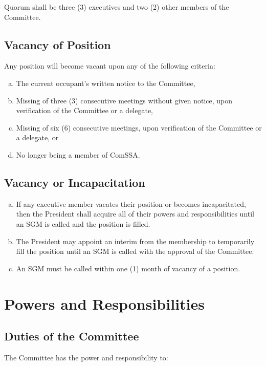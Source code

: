 \documentclass[a4paper,12pt]{article}
\begin{document}
Quorum shall be three (3) executives and two (2) other members of the Committee.

\subsection{Vacancy of Position}

Any position will become vacant upon any of the following criteria:

\begin{enumerate}[a)]
	\item The current occupant's written notice to the Committee,
	\item Missing of three (3) consecutive meetings without given notice, upon verification of the Committee or a delegate,
	\item Missing of six (6) consecutive meetings, upon verification of the Committee or a delegate, or
	\item No longer being a member of ComSSA.
\end{enumerate}

\subsection{Vacancy or Incapacitation}

\begin{enumerate}[a)]
	\item If any executive member vacates their position or becomes incapacitated, then the President shall acquire all of their powers and responsibilities until an SGM is called and the position is filled.
	\item The President may appoint an interim from the membership to temporarily fill the position until an SGM is called with the approval of the Committee.
	\item An SGM must be called within one (1) month of vacancy of a position.
\end{enumerate}

\section{Powers and Responsibilities}

\subsection{Duties of the Committee}

The Committee has the power and responsibility to:
\end{document}
